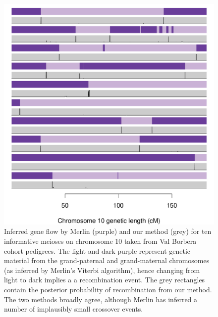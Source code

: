 \begin{figure}
 \begin{center} 
  \includegraphics[width=\textwidth]{chap4figs/Fig4}
  \caption[Crossover detection (Merlin and DuoHMM) on ten real meioses]{Inferred gene flow by Merlin (purple) and our method (grey) for ten informative meioses on chromosome 10 taken from Val Borbera cohort pedigrees.  The light and dark purple represent genetic material from the grand-paternal and grand-maternal chromosomes (as inferred by Merlin's Viterbi algorithm), hence changing from light to dark implies a a recombination event.  The grey rectangles contain the posterior probability of recombination from our method.  The two methods broadly agree, although Merlin has inferred a number of implausibly small crossover events.\label{fig:shapeit-merlin}}
 \end{center} 
\end{figure}

